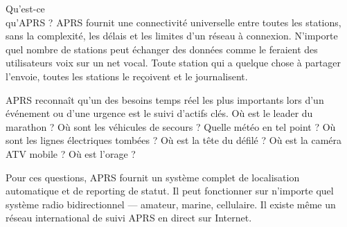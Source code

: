\begin{aprssideblock}{Qu'est-ce\\qu'APRS ?}
APRS fournit une connectivité universelle entre toutes les stations,
sans la complexité, les délais et les limites d'un réseau à connexion.
N'importe quel nombre de stations peut échanger des données comme le
feraient des utilisateurs voix sur un net vocal. Toute station qui a
quelque chose à partager l'envoie, toutes les stations le reçoivent et
le journalisent.

APRS reconnaît qu'un des besoins temps réel les plus importants lors
d'un événement ou d'une urgence est le suivi d'actifs clés. Où est le
leader du marathon ? Où sont les véhicules de secours ? Quelle météo en
tel point ? Où sont les lignes électriques tombées ? Où est la tête du
défilé ? Où est la caméra ATV mobile ? Où est l'orage ?

Pour ces questions, APRS fournit un système complet de localisation
automatique et de reporting de statut. Il peut fonctionner sur n'importe
quel système radio bidirectionnel --- amateur, marine, cellulaire. Il
existe même un réseau international de suivi APRS en direct sur
Internet.
\end{aprssideblock}

